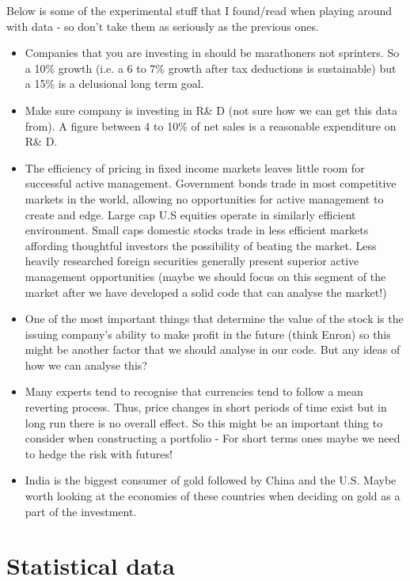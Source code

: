\documentclass[12 pt]{article}
\begin{document}
Below is some of the experimental stuff that I found/read when playing around with data - so don't take them as seriously as the previous ones. 
\begin{itemize}
\item Companies that you are investing in should be marathoners not sprinters. So a 10\% growth (i.e. a 6 to 7\% growth after tax deductions is sustainable) but a 15\% is a delusional long term goal. 
\item Make sure company is investing in R\& D (not sure how we can get this data from). A figure between 4 to 10\% of net sales is a reasonable expenditure on R\& D. 

\item The efficiency of pricing in fixed income markets leaves little room for successful active management. Government bonds trade in most competitive markets in the world, allowing no opportunities for active management to create and edge. Large cap U.S equities operate in similarly efficient environment. Small caps domestic stocks trade in less efficient markets affording thoughtful investors the possibility of beating the market. Less heavily researched foreign securities generally present superior active management opportunities (maybe we should focus on this segment of the market after we have developed a solid code that can analyse the market!) 

\item One of the most important things that determine the value of the stock  is the issuing company’s ability to make profit in the future (think Enron) so this might be another factor that we should analyse in our code. But any ideas of how we can analyse this? 

\item Many experts tend to recognise that currencies tend to follow a mean reverting process. Thus, price changes in short periods of time exist but in long run there is no overall effect. So this might be an important thing to consider when constructing a portfolio - For short terms ones maybe we need to hedge the risk with futures! 

\item India is the biggest consumer of gold followed by China and the U.S. Maybe worth looking at the economies of these countries when deciding on gold as a part of the investment.

\end{itemize}

\section{Statistical data}
\end{document}
